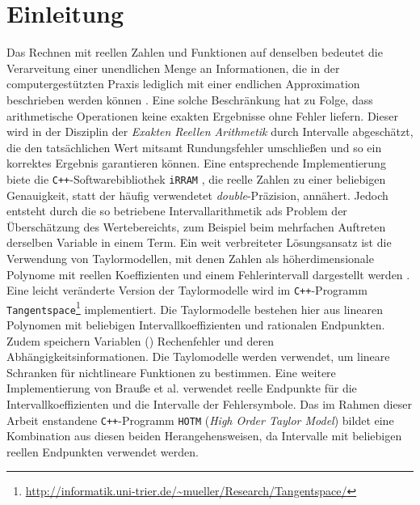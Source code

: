 
\chapter{Einleitung}
\label{ch:Einleitung}

Das Rechnen mit reellen Zahlen und Funktionen auf denselben bedeutet die Verarveitung einer unendlichen Menge an Informationen, die in der computergestützten Praxis lediglich mit einer endlichen Approximation beschrieben werden können \cite{Brattka2008}. Eine solche Beschränkung hat zu Folge, dass arithmetische Operationen keine exakten Ergebnisse ohne Fehler liefern. Dieser wird in der Disziplin der \textit{Exakten Reellen Arithmetik} durch Intervalle abgeschätzt, die den tatsächlichen Wert mitsamt Rundungsfehler umschließen und so ein korrektes Ergebnis garantieren können. Eine entsprechende Implementierung biete die \verb.C++.-Softwarebibliothek \verb+iRRAM+ \cite{Mller2009EnhancingIE}, die reelle Zahlen zu einer beliebigen Genauigkeit, statt der häufig verwendetet \textit{double}-Präzision, annähert.
Jedoch entsteht durch die so betriebene Intervallarithmetik ads Problem der Überschätzung des Wertebereichts, zum Beispiel beim mehrfachen Auftreten derselben Variable in einem Term. Ein weit verbreiteter Lösungsansatz ist die Verwendung von Taylormodellen, mit denen Zahlen als höherdimensionale Polynome mit reellen Koeffizienten und einem Fehlerintervall dargestellt werden \cite{DBLP:conf/macis/BrausseKM15} \cite{makino2001}. Eine leicht veränderte Version der Taylormodelle wird im \verb.C++.-Programm \verb+Tangentspace+\footnote{\url{http://informatik.uni-trier.de/~mueller/Research/Tangentspace/}} implementiert. Die Taylormodelle bestehen hier aus linearen Polynomen mit beliebigen Intervallkoeffizienten und rationalen Endpunkten. Zudem speichern Variablen () Rechenfehler und deren Abhängigkeitsinformationen. Die Taylomodelle werden verwendet, um lineare Schranken für nichtlineare Funktionen zu bestimmen. Eine weitere Implementierung von Brauße et al. \cite{DBLP:conf/macis/BrausseKM15} verwendet reelle Endpunkte für die Intervallkoeffizienten und die Intervalle der Fehlersymbole. Das im Rahmen dieser Arbeit enstandene \verb.C++.-Programm \verb+HOTM+ (\textit{High Order Taylor Model}) bildet eine Kombination aus diesen beiden Herangehensweisen, da Intervalle mit beliebigen reellen Endpunkten verwendet werden. 


